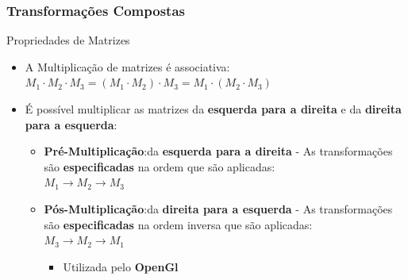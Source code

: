 \documentclass{beamer}
\begin{document}
\begin{frame}
\frametitle{Transformações Compostas}
	\begin{block}{Propriedades de Matrizes}
		\begin{itemize}
			\item<1-> A Multiplicação de matrizes é associativa:\\
				$M_1 \cdot M_2 \cdot M_3 = (M_1 \cdot M_2) \cdot M_3 = M_1 \cdot( M_2 \cdot M_3)  $
			\item<2-> É possível multiplicar as matrizes da \textbf{esquerda para a direita} e da \textbf{direita para a esquerda}:
				\begin{itemize}
					\item \textbf{Pré-Multiplicação}:da \textbf{esquerda para a direita} - As transformações são \textbf{especificadas} na ordem que são aplicadas: \\ $M_1 \to M_2 \to M_3$ \\
					\item<3-> \textbf{Pós-Multiplicação}:da \textbf{direita para a esquerda} - As transformações são \textbf{especificadas} na ordem inversa que são aplicadas: \\
					$M_3 \to M_2 \to M_1$ \\
					\begin{itemize}
						\item Utilizada pelo \textbf{OpenGl}
					\end{itemize}
				\end{itemize}
		\end{itemize}
	\end{block}
	
	
\end{frame}
\end{document}

